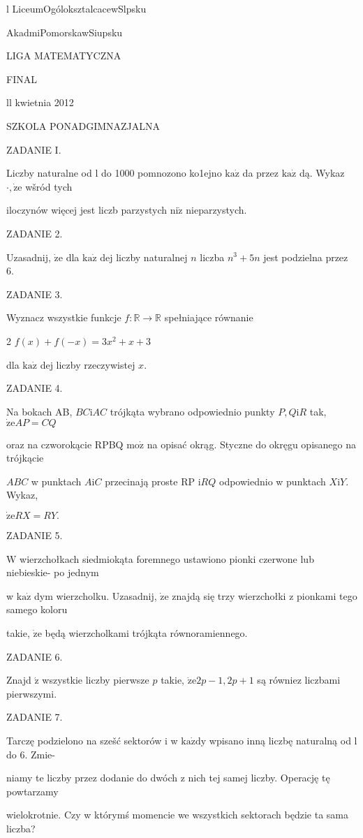 \documentclass[a4paper,12pt]{article}
\begin{document}
l LiceumOgóloksztalcacewSlpsku

AkadmiPomorskawSiupsku

LIGA MATEMATYCZNA

FINAL

ll kwietnia 2012

SZKOLA PONADGIMNAZJALNA

ZADANIE I.

Liczby naturalne od l do 1000 pomnozono ko1ejno $\mathrm{k}\mathrm{a}\dot{\mathrm{z}}$ da przez $\mathrm{k}\mathrm{a}\dot{\mathrm{z}}$ dą. Wykaz$\cdot, \dot{\mathrm{z}}\mathrm{e}$ wšród tych

iloczynów więcej jest liczb parzystych $\mathrm{n}\mathrm{i}\dot{\mathrm{z}}$ nieparzystych.

ZADANIE 2.

Uzasadnij, $\dot{\mathrm{z}}\mathrm{e}$ dla $\mathrm{k}\mathrm{a}\dot{\mathrm{z}}$ dej liczby naturalnej $n$ liczba $n^{3}+5n$ jest podzielna przez 6.

ZADANIE 3.

Wyznacz wszystkie funkcje $f:\mathbb{R}\rightarrow \mathbb{R}$ spełniające równanie

2 $f(x)+f(-x)=3x^{2}+x+3$

dla $\mathrm{k}\mathrm{a}\dot{\mathrm{z}}$ dej liczby rzeczywistej $x.$

ZADANIE 4.

Na bokach AB, $BC\mathrm{i}AC$ trójkąta wybrano odpowiednio punkty $P, Q\mathrm{i}R$ tak, $\dot{\mathrm{z}}\mathrm{e}AP=CQ$

oraz na czworokącie RPBQ $\mathrm{m}\mathrm{o}\dot{\mathrm{z}}$ na opisać okrąg. Styczne do okręgu opisanego na trójkącie

$ABC$ w punktach $A\mathrm{i}C$ przecinają proste RP $\mathrm{i}RQ$ odpowiednio w punktach $X\mathrm{i}Y$. Wykaz,

$\dot{\mathrm{z}}\mathrm{e}RX=RY.$

ZADANIE 5.

$\mathrm{W}$ wierzchołkach siedmiokąta foremnego ustawiono pionki czerwone lub niebieskie- po jednym

w $\mathrm{k}\mathrm{a}\dot{\mathrm{z}}$ dym wierzcholku. Uzasadnij, $\dot{\mathrm{z}}\mathrm{e}$ znajdą się trzy wierzchołki z pionkami tego samego koloru

takie, $\dot{\mathrm{z}}\mathrm{e}$ będą wierzcholkami trójkąta równoramiennego.

ZADANIE 6.

Znajd $\acute{\mathrm{z}}$ wszystkie liczby pierwsze $p$ takie, $\dot{\mathrm{z}}\mathrm{e}2p-1, 2p+1$ są równiez liczbami pierwszymi.

ZADANIE 7.

Tarczę podzielono na szešć sektorów i w $\mathrm{k}\mathrm{a}\dot{\mathrm{z}}\mathrm{d}\mathrm{y}$ wpisano inną liczbę naturalną od l do 6. Zmie-

niamy te liczby przez dodanie do dwóch z nich tej samej liczby. Operację tę powtarzamy

wielokrotnie. Czy w którymś momencie we wszystkich sektorach będzie ta sama liczba?
\end{document}
